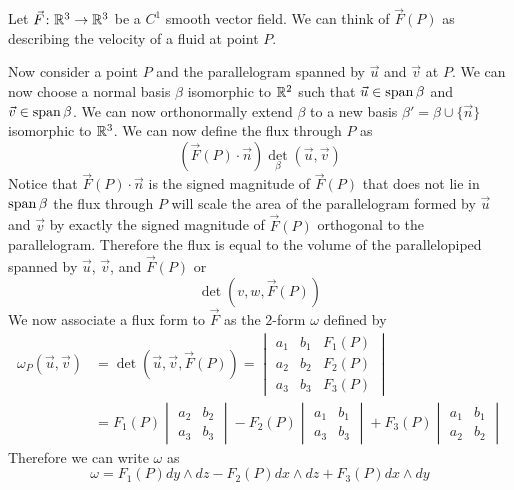 \documentclass[notes]{subfiles}
\begin{document}
\begin{example}
    Let $\vec{F}\colon \mathbb{R}^3 \to \mathbb{R}^3$ be a $C^1$ smooth vector field. We can think of $\vec{F}(P)$ as describing the velocity of a fluid at point $P$.

    Now consider a point $P$ and the parallelogram spanned by $\vec{u}$ and $\vec{v}$ at $P$. We can now choose a normal basis $\beta$ isomorphic to $\mathbb{R}^2$ such that $\vec{u} \in \operatorname{span}\beta$ and $\vec{v} \in \operatorname{span}\beta$. We can now orthonormally extend $\beta$ to a new basis $\beta' = \beta \cup \{ \vec{n} \}$ isomorphic to $\mathbb{R}^3$. We can now define the flux through $P$ as
    \[
        (\vec{F}(P)\cdot\vec{n})\det_\beta(\vec{u}, \vec{v})
    \]
    Notice that $\vec{F}(P)\cdot\vec{n}$ is the signed magnitude of $\vec{F}(P)$ that does not lie in $\operatorname{span} \beta$ the flux through $P$ will scale the area of the parallelogram formed by $\vec{u}$ and $\vec{v}$ by exactly the signed magnitude of $\vec{F}(P)$ orthogonal to the parallelogram. Therefore the flux is equal to the volume of the parallelopiped spanned by $\vec{u}$, $\vec{v}$, and $\vec{F}(P)$ or
    \[
        \det(v, w, \vec{F}(P))
    \]
    We now associate a flux form to $\vec{F}$ as the $2$-form $\omega$ defined by
    \begin{align*}
        \omega_P(\vec{u}, \vec{v})
        &= \det(\vec{u}, \vec{v}, \vec{F}(P))
        = \begin{vmatrix}
            a_1 & b_1 & F_1(P) \\
            a_2 & b_2 & F_2(P) \\
            a_3 & b_3 & F_3(P)
        \end{vmatrix} \\
        &= F_1(P)\begin{vmatrix}
            a_2 & b_2 \\
            a_3 & b_3
        \end{vmatrix}
        - F_2(P)\begin{vmatrix}
            a_1 & b_1 \\
            a_3 & b_3
        \end{vmatrix}
        + F_3(P)\begin{vmatrix}
            a_1 & b_1 \\
            a_2 & b_2
        \end{vmatrix}
    \end{align*}
    Therefore we can write $\omega$ as
    \[
        \omega = F_1(P)dy\wedge dz - F_2(P)dx\wedge dz + F_3(P)dx \wedge dy
    \]
\end{example}
\end{document}
